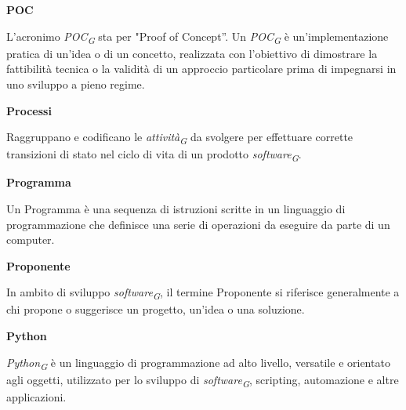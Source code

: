 \documentclass{article}
\begin{document}
\vspace{0.4cm}

\textbf{POC}

\vspace{0.1cm}

L'acronimo \textit{POC}\textsubscript{\textit{G}} sta per "Proof of Concept”. Un \textit{POC}\textsubscript{\textit{G}} è un'implementazione pratica di un'idea o di un concetto, realizzata con l'obiettivo di dimostrare la fattibilità tecnica o la validità di un approccio particolare prima di impegnarsi in uno sviluppo a pieno regime.

\vspace{0.4cm}

\textbf{Processi}

\vspace{0.1cm}

Raggruppano e codificano le \textit{attività}\textsubscript{\textit{G}} da svolgere per effettuare corrette transizioni di stato nel ciclo di vita di un prodotto \textit{software}\textsubscript{\textit{G}}.

\vspace{0.4cm}

\textbf{Programma}

\vspace{0.1cm}

Un Programma è una sequenza di istruzioni scritte in un linguaggio di programmazione che definisce una serie di operazioni da eseguire da parte di un computer.

\vspace{0.4cm}

\textbf{Proponente}

\vspace{0.1cm}

In ambito di sviluppo \textit{software}\textsubscript{\textit{G}}, il termine Proponente si riferisce generalmente a chi propone o suggerisce un progetto, un'idea o una soluzione.

\vspace{0.4cm}

\textbf{Python}

\vspace{0.1cm}

\textit{Python}\textsubscript{\textit{G}} è un linguaggio di programmazione ad alto livello, versatile e orientato agli oggetti, utilizzato per lo sviluppo di \textit{software}\textsubscript{\textit{G}}, scripting, automazione e altre applicazioni.

\vspace{0.4cm}
\end{document}
